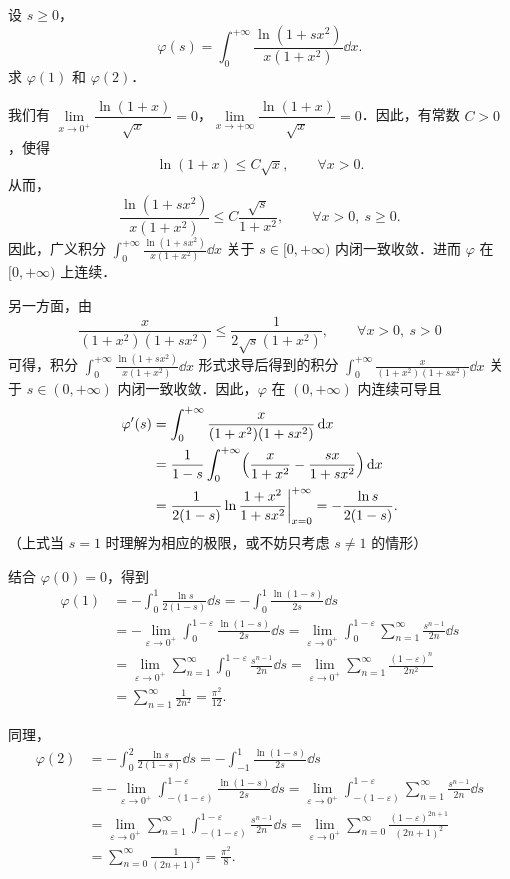 设 $s\ge 0$，
\[
  \varphi(s)=\int_0^{+\infty}\frac{\ln(1+sx^2)}{x(1+x^2)}\dd x.
\]
求 $\varphi(1)$ 和 $\varphi(2)$．

\begin{solution}
我们有 $\lim\limits_{x\to 0^+}\dfrac{\ln(1+x)}{\sqrt{x}}=0$，$\lim\limits_{x\to+\infty}\dfrac{\ln(1+x)}{\sqrt{x}}=0$．因此，有常数 $C>0$，使得
\[
  \ln(1+x)\le C\sqrt{x},\qquad \forall x>0.
\]
从而，
\[
  \frac{\ln(1+sx^2)}{x(1+x^2)}\le C\frac{\sqrt{s}}{1+x^2},\qquad \forall x>0,\ s\ge 0.
\]
因此，广义积分 $\displaystyle\int_0^{+\infty}\frac{\ln(1+sx^2)}{x(1+x^2)}\dd x$ 关于 $s\in[0,+\infty)$ 内闭一致收敛．进而 $\varphi$ 在 $[0,+\infty)$ 上连续．

另一方面，由
\[
  \frac{x}{(1+x^2)(1+sx^2)}\le \frac{1}{2\sqrt{s}(1+x^2)},\qquad \forall x>0,\ s>0
\]
可得，积分 $\displaystyle\int_0^{+\infty}\frac{\ln(1+sx^2)}{x(1+x^2)}\dd x$ 形式求导后得到的积分 $\displaystyle\int_0^{+\infty}\frac{x}{(1+x^2)(1+sx^2)}\dd x$ 关于 $s\in(0,+\infty)$ 内闭一致收敛．因此，$\varphi$ 在 $(0,+\infty)$ 内连续可导且
\begin{align*}
  \varphi'(s)&=\int_0^{+\infty}\frac{x}{(1+x^2)(1+sx^2)}\,\mathrm{d} x\\
  &=\frac{1}{1-s}\int_0^{+\infty}\Bigl(\frac{x}{1+x^2}-\frac{sx}{1+sx^2}\Bigr)\,\mathrm{d} x\\
  &=\frac{1}{2(1-s)}\ln\frac{1+x^2}{1+sx^2}\biggr|_{x=0}^{+\infty}=-\frac{\ln s}{2(1-s)}.
\end{align*}
（上式当 $s=1$ 时理解为相应的极限，或不妨只考虑 $s\ne 1$ 的情形）

结合 $\varphi(0)=0$，得到
\begin{align*}
  \varphi(1)&=-\int_0^1\frac{\ln s}{2(1-s)}\dd s=-\int_0^1\frac{\ln(1-s)}{2s}\dd s\\
  &=-\lim_{\varepsilon\to 0^+}\int_0^{1-\varepsilon}\frac{\ln(1-s)}{2s}\dd s
   =\lim_{\varepsilon\to 0^+}\int_0^{1-\varepsilon}\sum_{n=1}^{\infty}\frac{s^{n-1}}{2n}\dd s\\
  &=\lim_{\varepsilon\to 0^+}\sum_{n=1}^{\infty}\int_0^{1-\varepsilon}\frac{s^{n-1}}{2n}\dd s
   =\lim_{\varepsilon\to 0^+}\sum_{n=1}^{\infty}\frac{(1-\varepsilon)^n}{2n^2}\\
  &=\sum_{n=1}^{\infty}\frac{1}{2n^2}=\frac{\pi^2}{12}.
\end{align*}

同理，
\begin{align*}
  \varphi(2)&=-\int_0^2\frac{\ln s}{2(1-s)}\dd s=-\int_{-1}^1\frac{\ln(1-s)}{2s}\dd s\\
  &=-\lim_{\varepsilon\to 0^+}\int_{-(1-\varepsilon)}^{1-\varepsilon}\frac{\ln(1-s)}{2s}\dd s
   =\lim_{\varepsilon\to 0^+}\int_{-(1-\varepsilon)}^{1-\varepsilon}\sum_{n=1}^{\infty}\frac{s^{n-1}}{2n}\dd s\\
  &=\lim_{\varepsilon\to 0^+}\sum_{n=1}^{\infty}\int_{-(1-\varepsilon)}^{1-\varepsilon}\frac{s^{n-1}}{2n}\dd s
   =\lim_{\varepsilon\to 0^+}\sum_{n=0}^{\infty}\frac{(1-\varepsilon)^{2n+1}}{(2n+1)^2}\\
  &=\sum_{n=0}^{\infty}\frac{1}{(2n+1)^2}=\frac{\pi^2}{8}.
\end{align*}


\end{solution}
